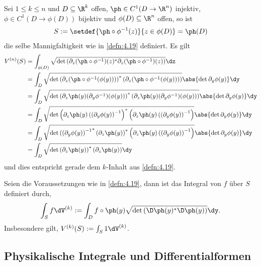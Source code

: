 \begin{bem}
\label{bem:4.21}
Sei $1\le k\le n$ und $D\subseteq \R^k$ offen, $\ph\in C^1(D\to \R^n)$
injektiv, $\phi\in C^1(D\to\phi(D))$ bijektiv und $\phi(D)\subseteq \R^n$ offen, so
ist 
\begin{align*}
S := \setdef{\ph\circ\phi^{-1}(z)}{z\in\phi(D)} = \ph(D)
\end{align*}
die selbe Mannigfaltigkeit wie in \ref{defn:4.19} definiert.
 Es gilt
\begin{align*}
V^{(n)}(S) &= \int_{\phi(D)} \sqrt{\det\left(\partial_z
(\ph\circ\phi^{-1})(z)^{*}
\partial_z
(\ph\circ\phi^{-1})(z)\right)} \dz
\\ &=
\int_{D} \sqrt{\det\left( \partial_z
(\ph\circ\phi^{-1}(\phi(y)))\right)^{*}
\left( \partial_z
(\ph\circ\phi^{-1}(\phi(y)))\right)} \abs{\det \partial_y
\phi(y)} \dy
\\ &=
\int_{D} \sqrt{\det\left( \partial_z
\ph(y)(\partial_y \phi^{-1})(\phi(y)) \right)^{*}
\left( \partial_z
\ph(y)(\partial_y \phi^{-1})(\phi(y)) \right)}
\abs{\det \partial_y \phi(y)} \dy
\\ &=
\int_{D} \sqrt{\det\left( \partial_z
\ph(y)\left((\partial_y \phi(y)\right)^{-1}
\right)^{*} \left( \partial_z
\ph(y)\left((\partial_y \phi(y)\right)^{-1}
\right)} \abs{\det \partial_y \phi(y)} \dy
\\ &=
\int_{D} \sqrt{\det{\left((\partial_y \phi(y)\right)^{-1}}^{*}
\left( \partial_z \ph(y)
\right)^{*} \left( \partial_z
\ph(y)\left((\partial_y \phi(y)\right)^{-1}
\right)} \abs{\det\partial_y \phi(y)} \dy
\\ &=
\int_{D} \sqrt{\det\left( \partial_z \ph(y)
\right)^{*} \left( \partial_z
\ph(y)\right)}\dy
\end{align*}
und dies entspricht gerade dem $k$-Inhalt aus \ref{defn:4.19}.
\maphere
\end{bem}
\begin{defn}
\label{defn:4.22}
Seien die Voraussetzungen wie in \ref{defn:4.19}, dann ist das Integral von $f$
über $S$ definiert durch,
\begin{align*}
\int_S f \dV^{(k)} := \int_D f\circ\ph(y) \sqrt{\det
\left(\D\ph(y)^*\D\ph(y)\right)}
\dy.
\end{align*}
Insbesondere gilt, $V^{(k)}(S) := \int_S 1\dV^{(k)}$.\fishhere
\end{defn}

\subsection{Physikalische Integrale und Differentialformen}

